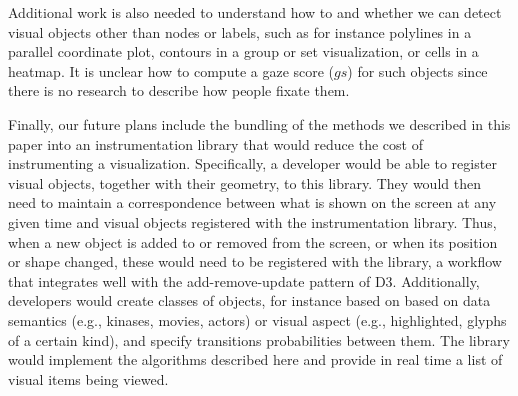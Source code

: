 Additional work is also needed to understand how to and whether we can detect visual objects other than nodes or labels, such as for instance polylines in a parallel coordinate plot, contours in a group or set visualization, or cells in a heatmap. It is unclear how to compute a gaze score ($gs$) for such objects since there is no research to describe how people fixate them. 

Finally, our future plans include the bundling of the methods we described in this paper into an instrumentation library that would reduce the cost of instrumenting a visualization. Specifically, a developer would be able to register visual objects, together with their geometry, to this library. They would then need to maintain a correspondence between what is shown on the screen at any given time and visual objects registered with the instrumentation library. Thus, when a new object is added to or removed from the screen, or when its position or shape changed, these would need to be registered with the library, a workflow that integrates well with the add-remove-update pattern of D3. Additionally, developers would create classes of objects, for instance based on based on data semantics (e.g., kinases, movies, actors) or visual aspect (e.g., highlighted, glyphs of a certain kind), and specify transitions probabilities between them. The library would implement the algorithms described here and provide in real time a list of visual items being viewed.   